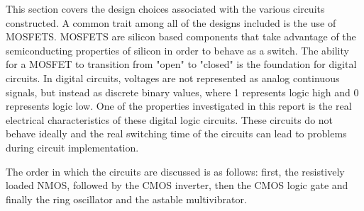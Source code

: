 



This section covers the design choices associated with the various circuits constructed. A common trait among all of the designs included is the use of  MOSFETS. MOSFETS are silicon based components that take advantage of the semiconducting properties of silicon in order to behave as a switch. The ability for a MOSFET to transition from "open" to "closed" is the foundation for digital circuits. In digital circuits, voltages are not represented as analog continuous signals, but instead as discrete binary values, where 1 represents logic high and 0 represents logic low. One of the properties investigated in this report is the real electrical characteristics of these digital logic circuits. These circuits do not behave ideally and the real switching time of the circuits can lead to problems during circuit implementation.

The order in which the circuits are discussed is as follows: first, the resistively loaded NMOS, followed by the CMOS inverter, then the CMOS logic gate and finally the ring oscillator and the astable multivibrator. 






